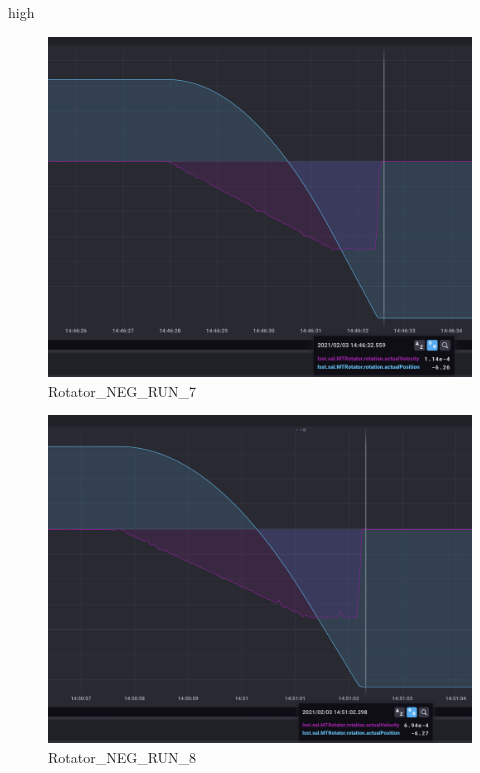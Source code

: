 high\documentclass[SE,lsstdraft,authoryear,toc]{lsstdoc}
\begin{document}
\begin{figure}[h!]
  \includegraphics[width=\linewidth]{media/Rotator_design_speed_neg_test7.png}
  \caption{Rotator\_NEG\_RUN\_7}
  \label{fig:Rotator_NEG_RUN_7}
\end{figure}
\begin{figure}[h!]
  \includegraphics[width=\linewidth]{media/Rotator_design_speed_neg_test8.png}
  \caption{Rotator\_NEG\_RUN\_8}
  \label{fig:Rotator_NEG_RUN_8}
\end{figure}
\end{document}
